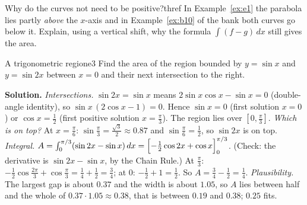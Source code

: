 \documentclass[11pt]{article}
\begin{document}
\begin{think}{Why do the curves not need to be positive?}{thref}
In Example~\ref{ex:e1} the parabola lies partly \emph{above} the $x$-axis and in Example~\ref{ex:b10} of the bank both curves go below it. Explain, using a vertical shift, why the formula $\int(f-g)\,dx$ still gives the area.
\end{think}

\begin{exmp}{A trigonometric region}{e3}
Find the area of the region bounded by $y=\sin x$ and $y=\sin2x$ between $x=0$ and their next intersection to the right.

\textbf{Solution.} \emph{Intersections.} $\sin2x=\sin x$ means $2\sin x\cos x-\sin x=0$ (double-angle identity), so $\sin x\,(2\cos x-1)=0$. Hence $\sin x=0$ (first solution $x=0$) or $\cos x=\frac12$ (first positive solution $x=\frac\pi3$). The region lies over $\left[0,\frac\pi3\right]$.
\emph{Which is on top?} At $x=\frac\pi6$: $\sin\frac\pi3=\frac{\sqrt3}2\approx0.87$ and $\sin\frac\pi6=\frac12$, so $\sin2x$ is on top.
\emph{Integral.} $A=\int_0^{\pi/3}(\sin2x-\sin x)\,dx=\Bigl[-\tfrac12\cos2x+\cos x\Bigr]_0^{\pi/3}$. (Check: the derivative is $\sin2x-\sin x$, by the Chain Rule.) At $\frac\pi3$: $-\frac12\cos\frac{2\pi}3+\cos\frac\pi3=\frac14+\frac12=\frac34$; at $0$: $-\frac12+1=\frac12$. So $A=\frac34-\frac12=\frac14$.
\emph{Plausibility.} The largest gap is about $0.37$ and the width is about $1.05$, so $A$ lies between half and the whole of $0.37\cdot1.05\approx0.38$, that is between $0.19$ and $0.38$; $0.25$ fits.


\end{exmp}
\end{document}
